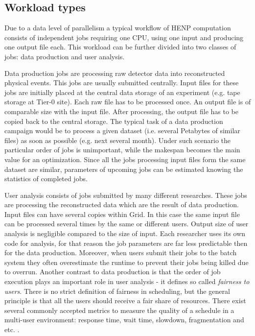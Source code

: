 \documentclass[english]{ddny}
\begin{document}
\subsection{Workload types}
Due to a data level of parallelism a typical workflow of HENP computation
consists of independent jobs requiring one CPU,  using one input and producing one output file each. This workload can be further divided into two classes of jobs: data production and user analysis.

Data production jobs are processing raw detector data into reconstructed physical events. This jobs are usually submitted centrally. Input files for these jobs are initially placed at the central data storage of an experiment (e.g. tape storage at Tier-0 site). Each raw file has to be processed once. An output file is of comparable size with the input file. After processing, the output file has to be copied back to the central storage. The typical task of a data production campaign would be to process a given dataset (i.e. several Petabytes of similar files) as soon as possible (e.g. next several month). Under such scenario the particular order of jobs is unimportant, while the makespan becomes the main value for an optimization. Since all the jobs processing input files form the same dataset are similar, parameters of upcoming jobs can be estimated knowing the statistics of completed jobs.

User analysis consists of jobs submitted by many different researches. These jobs are processing the reconstructed data which are the result of data production. Input files can have several copies within Grid. In this case the same input file can be processed several times by the same or different users. Output size of user analysis is negligible compared to the size of input. Each researcher uses its own code for analysis, for that reason the job parameters are far less predictable then for the data production. Moreover, when users submit their jobs to the batch system they often overestimate the runtime  to prevent their jobs being killed due to overrun.  Another contrast to data production is that the order of job execution plays an important role in user analysis - it defines so called \textit{fairness to users}. There is no strict definition of fairness in scheduling, but the general principle is that all the users should receive a fair share of resources. There exist several commonly accepted metrics to measure the quality of a schedule in a multi-user environment: response time, wait time, slowdown, fragmentation and etc. \cite{Rudova_Tabu_search}. 
\end{document}
